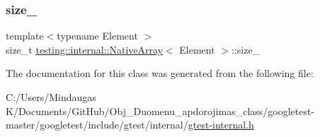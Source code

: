 \subsubsection{\texorpdfstring{size\_}{size\_}}
{\footnotesize\ttfamily template$<$typename Element $>$ \\
size\+\_\+t \mbox{\hyperlink{classtesting_1_1internal_1_1_native_array}{testing\+::internal\+::\+Native\+Array}}$<$ Element $>$\+::size\+\_\+\hspace{0.3cm}{\ttfamily [private]}}



The documentation for this class was generated from the following file\+:\begin{DoxyCompactItemize}
\item 
C\+:/\+Users/\+Mindaugas K/\+Documents/\+Git\+Hub/\+Obj\+\_\+\+Duomenu\+\_\+apdorojimas\+\_\+class/googletest-\/master/googletest/include/gtest/internal/\mbox{\hyperlink{googletest-master_2googletest_2include_2gtest_2internal_2gtest-internal_8h}{gtest-\/internal.\+h}}\end{DoxyCompactItemize}
